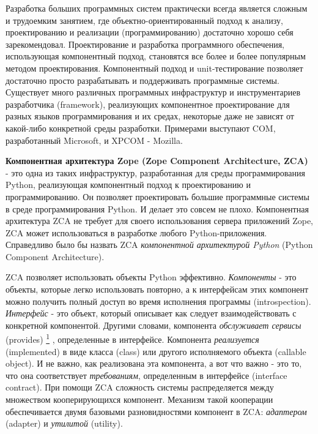 \documentclass[14pt,a4paper,openany,twoside,final]{extbook}
\providecommand*{\DUfootnotemark}[3]{%
  \raisebox{1em}{\hypertarget{#1}{}}%
  \hyperlink{#2}{\textsuperscript{#3}}%
}
\providecommand*{\DUroletitlereference}[1]{\textsl{#1}}
\begin{document}

Разработка больших программных систем практически всегда является
сложным и трудоемким занятием, где объектно-ориентированный подход к
анализу, проектированию и реализации (программированию) достаточно
хорошо себя зарекомендовал.  Проектирование и разработка программного
обеспечения, использующая компонентный подход, становятся все более и
более популярным методом проектирования.  Компонентный подход и
unit-тестирование позволяет достаточно просто разрабатывать и
поддерживать программные системы.  Существует много различных
программных инфраструктур и инструментариев разработчика (framework),
реализующих компонентное проектирование для разных языков
программирования и их средах, некоторые даже не зависят от какой-либо
конкретной среды разработки.  Примерами выступают COM, разработанный
Microsoft, и XPCOM - Mozilla.

\textbf{Компонентная архитектура Zope (Zope Component Architecture, ZCA)} -
это одна из таких инфраструктур, разработанная для среды
программирования Python, реализующая компонентный подход к
проектированию и программированию.  Он позволяет проектировать большие
программные системы в среде программирования Python.  И делает это
совсем не плохо.  Компонентная архитектура ZCA не требует для своего
использования сервера приложений Zope, ZCA может использоваться в
разработке любого Python-приложения.  Справедливо было бы назвать ZCA
\DUroletitlereference{компонентной архитектурой Python} (Python Component Architecture).

ZCA позволяет использовать объекты Python эффективно.  \DUroletitlereference{Компоненты} -
это объекты, которые легко использовать повторно, а к интерфейсам этих
компонент можно получить полный доступ во время исполнения программы
(introspection).  \DUroletitlereference{Интерфейс} - это объект, который описывает как
следует взаимодействовать с конкретной компонентой.  Другими словами,
компонента \DUroletitlereference{обслуживает сервисы} (provides)\DUfootnotemark{id3}{fn1}{1}, определенные в
интерфейсе.  Компонента \DUroletitlereference{реализуется} (implemented) в виде класса
(class) или другого исполняемого объекта (callable object).  И не
важно, как реализована эта компонента, а вот что важно - это то, что
она соответствует \DUroletitlereference{требованиям}, определенным в интерфейсе (interface
contract).  При помощи ZCA сложность системы распределяется между
множеством кооперирующихся компонент.  Механизм такой кооперации
обеспечивается двумя базовыми разновидностями компонент в ZCA:
\DUroletitlereference{адаптером} (adapter) и \DUroletitlereference{утилитой} (utility).
\end{document}
